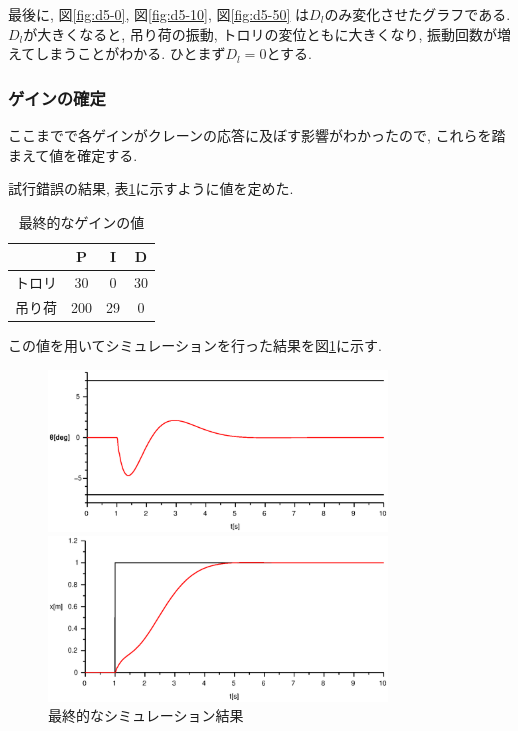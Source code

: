 \documentclass[titlepage]{jsarticle}
\begin{document}
            最後に, 図\ref{fig:d5-0}, 図\ref{fig:d5-10}, 図\ref{fig:d5-50}
            は$D_l$のみ変化させたグラフである.
            $D_l$が大きくなると, 吊り荷の振動, トロリの変位ともに大きくなり,
            振動回数が増えてしまうことがわかる.
            ひとまず$D_l = 0$とする.

        \subsubsection{ゲインの確定}
            ここまでで各ゲインがクレーンの応答に及ぼす影響がわかったので,
            これらを踏まえて値を確定する.

            試行錯誤の結果, 表\ref{tab:gain}に示すように値を定めた.

            \begin{table}[h]
                \caption{最終的なゲインの値}
                \label{tab:gain}
                \centering
                \begin{tabular}{c||c|c|c}
                    & P & I & D \\ \hline \hline
                    トロリ & 30 & 0 & 30 \\ \hline
                    吊り荷 & 200 & 29 & 0
                \end{tabular}
            \end{table}

            この値を用いてシミュレーションを行った結果を図\ref{fig:king}に示す.

            \begin{figure}[h]
                \begin{minipage}{0.5\hsize}
                    \centering
                    \includegraphics[width=9cm]{img/kingt.eps}
                \end{minipage}
                \begin{minipage}{0.5\hsize}
                    \centering
                    \includegraphics[width=9cm]{img/kingx.eps}
                \end{minipage}
                \caption{最終的なシミュレーション結果}
                \label{fig:king}
            \end{figure}
\end{document}
